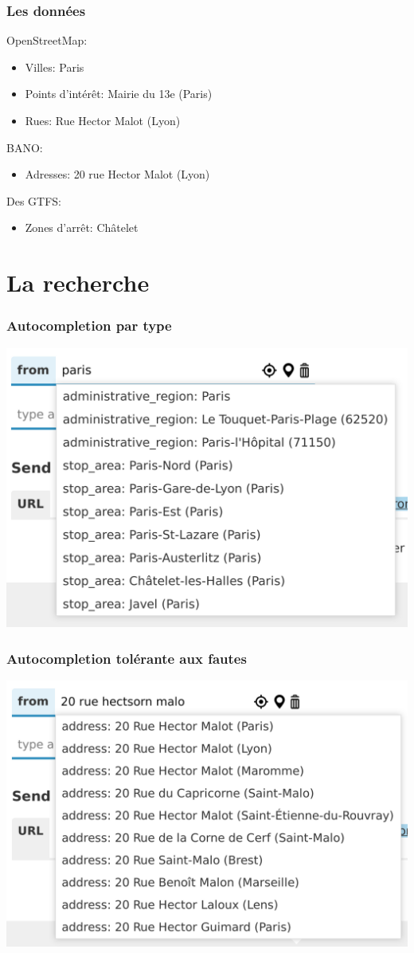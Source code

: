 \documentclass[table]{beamer}
\begin{document}
\begin{frame}
  \frametitle{Les données}

  OpenStreetMap:
  \begin{itemize}
  \item Villes: Paris
  \item Points d'intérêt: Mairie du 13e (Paris)
  \item Rues: Rue Hector Malot (Lyon)
  \end{itemize}

  BANO:
  \begin{itemize}
  \item Adresses: 20 rue Hector Malot (Lyon)
  \end{itemize}

  Des GTFS:
  \begin{itemize}
  \item Zones d'arrêt: Châtelet
  \end{itemize}
\end{frame}

\section{La recherche}

\begin{frame}
  \frametitle{Autocompletion par type}

  \centering
  \includegraphics[width=0.7\linewidth]{images/autocomplete-paris}
\end{frame}

\begin{frame}
  \frametitle{Autocompletion tolérante aux fautes}

  \centering
  \includegraphics[width=0.7\linewidth]{images/autocomplete-typo}
\end{frame}
\end{document}
